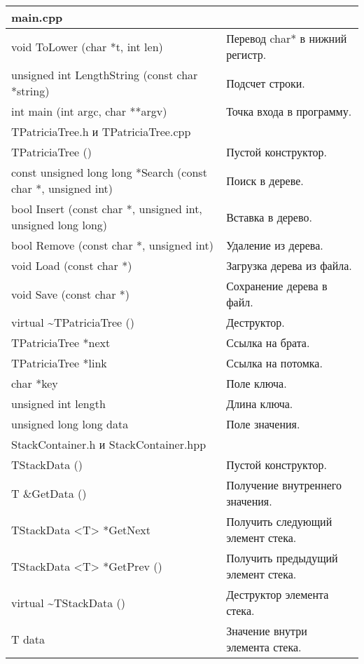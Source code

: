 \documentclass[pdf, unicode, 12pt, a4paper,oneside,fleqn]{article}
\begin{document}
\begin{longtable}{|p{8.4cm}|p{7.5cm}|}
\hline
\rowcolor{lightgray}
\multicolumn{2}{|c|} {main.cpp}\\
\hline
void ToLower (char *t, int len)& Перевод char* в нижний регистр.\\
\hline
\hline
unsigned int LengthString (const char *string)& Подсчет строки.\\
\hline
\hline
int main (int argc, char **argv)&Точка входа в программу.\\
\hline
\rowcolor{lightgray}
\multicolumn{2}{|c|} {TPatriciaTree.h и TPatriciaTree.cpp}\\
\hline TPatriciaTree ()&Пустой конструктор.\\ \hline
\hline const unsigned long long *Search (const char *, unsigned int)&Поиск в дереве.\\ \hline
\hline bool Insert (const char *, unsigned int, unsigned long long)&Вставка в дерево.\\ \hline
\hline bool Remove (const char *, unsigned int)&Удаление из дерева.\\ \hline
\hline void Load (const char *)&Загрузка дерева из файла.\\ \hline
\hline void Save (const char *)&Сохранение дерева в файл.\\ \hline
\hline virtual \textasciitilde TPatriciaTree ()&Деструктор.\\ \hline
\hline TPatriciaTree *next&Ссылка на брата.\\ \hline
\hline TPatriciaTree *link&Ссылка на потомка.\\ \hline
\hline char *key&Поле ключа.\\ \hline
\hline unsigned int length&Длина ключа.\\ \hline
\hline unsigned long long data&Поле значения.\\ \hline
\rowcolor{lightgray}
\multicolumn{2}{|c|} {StackContainer.h и StackContainer.hpp}\\
\hline TStackData () &Пустой конструктор.\\ \hline
\hline T \&GetData ()&Получение внутреннего значения.\\ \hline
\hline TStackData <T> *GetNext&Получить следующий элемент стека.\\ \hline
\hline TStackData <T> *GetPrev ()&Получить предыдущий элемент стека.\\ \hline
\hline virtual \textasciitilde TStackData ()&Деструктор элемента стека.\\ \hline
\hline T data& Значение внутри элемента стека.\\ \hline

\end{longtable}
\end{document}
